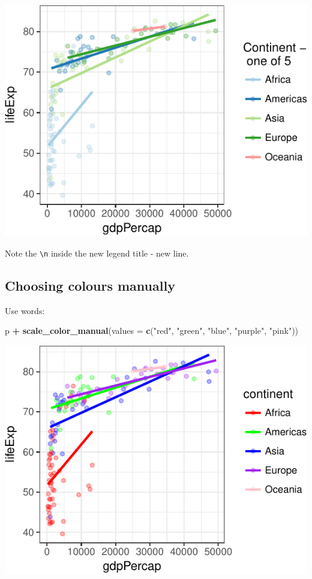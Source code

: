 \documentclass[12pt,]{krantz}
\makeatletter
\newenvironment{Shaded}{\begin{snugshade}}{\end{snugshade}}
\newcommand{\DataTypeTok}[1]{\textcolor[rgb]{0.13,0.29,0.53}{#1}}
\newcommand{\KeywordTok}[1]{\textcolor[rgb]{0.13,0.29,0.53}{\textbf{#1}}}
\newcommand{\NormalTok}[1]{#1}
\newcommand{\OperatorTok}[1]{\textcolor[rgb]{0.81,0.36,0.00}{\textbf{#1}}}
\newcommand{\StringTok}[1]{\textcolor[rgb]{0.31,0.60,0.02}{#1}}
\newenvironment{kframe}{%
\medskip{}
\setlength{\fboxsep}{.8em}
 \def\at@end@of@kframe{}%
 \ifinner\ifhmode%
  \def\at@end@of@kframe{\end{minipage}}%
  \begin{minipage}{\columnwidth}%
 \fi\fi%
 \def\FrameCommand##1{\hskip\@totalleftmargin \hskip-\fboxsep
 \colorbox{shadecolor}{##1}\hskip-\fboxsep
     \hskip-\linewidth \hskip-\@totalleftmargin \hskip\columnwidth}%
 \MakeFramed {\advance\hsize-\width
   \@totalleftmargin\z@ \linewidth\hsize
   \@setminipage}}%
 {\par\unskip\endMakeFramed%
 \at@end@of@kframe}
\renewenvironment{Shaded}{\begin{kframe}}{\end{kframe}}
\theoremstyle{definition}
\theoremstyle{definition}
\theoremstyle{definition}
\theoremstyle{remark}
\makeatother
\begin{document}
\includegraphics{05_fine_tuning_plots_files/figure-latex/unnamed-chunk-11-1.pdf}

Note the \texttt{\textbackslash{}n} inside the new legend title - new
line.

\hypertarget{choosing-colours-manually}{%
\subsection{Choosing colours manually}\label{choosing-colours-manually}}

Use words:

\begin{Shaded}
\begin{Highlighting}[]
\NormalTok{p }\OperatorTok{+}
\StringTok{  }\KeywordTok{scale_color_manual}\NormalTok{(}\DataTypeTok{values =} \KeywordTok{c}\NormalTok{(}\StringTok{"red"}\NormalTok{, }\StringTok{"green"}\NormalTok{, }\StringTok{"blue"}\NormalTok{, }\StringTok{"purple"}\NormalTok{, }\StringTok{"pink"}\NormalTok{))}
\end{Highlighting}
\end{Shaded}

\includegraphics{05_fine_tuning_plots_files/figure-latex/unnamed-chunk-12-1.pdf}
\end{document}
